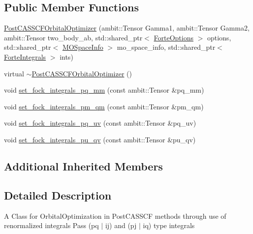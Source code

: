 \subsection*{Public Member Functions}
\begin{DoxyCompactItemize}
\item 
\mbox{\hyperlink{classforte_1_1_post_c_a_s_s_c_f_orbital_optimizer_a3a1a4891ed89f797a48a74d084c0a4f4}{Post\+C\+A\+S\+S\+C\+F\+Orbital\+Optimizer}} (ambit\+::\+Tensor Gamma1, ambit\+::\+Tensor Gamma2, ambit\+::\+Tensor two\+\_\+body\+\_\+ab, std\+::shared\+\_\+ptr$<$ \mbox{\hyperlink{classforte_1_1_forte_options}{Forte\+Options}} $>$ options, std\+::shared\+\_\+ptr$<$ \mbox{\hyperlink{classforte_1_1_m_o_space_info}{M\+O\+Space\+Info}} $>$ mo\+\_\+space\+\_\+info, std\+::shared\+\_\+ptr$<$ \mbox{\hyperlink{classforte_1_1_forte_integrals}{Forte\+Integrals}} $>$ ints)
\item 
virtual \mbox{\hyperlink{classforte_1_1_post_c_a_s_s_c_f_orbital_optimizer_af00d676f08aa31941da688c52cf0bd07}{$\sim$\+Post\+C\+A\+S\+S\+C\+F\+Orbital\+Optimizer}} ()
\item 
void \mbox{\hyperlink{classforte_1_1_post_c_a_s_s_c_f_orbital_optimizer_ac9c648911b5873fc47ffa7b6ead29d47}{set\+\_\+fock\+\_\+integrals\+\_\+pq\+\_\+mm}} (const ambit\+::\+Tensor \&pq\+\_\+mm)
\item 
void \mbox{\hyperlink{classforte_1_1_post_c_a_s_s_c_f_orbital_optimizer_a49d688b303e6d6bebe328b8bb7dc3091}{set\+\_\+fock\+\_\+integrals\+\_\+pm\+\_\+qm}} (const ambit\+::\+Tensor \&pm\+\_\+qm)
\item 
void \mbox{\hyperlink{classforte_1_1_post_c_a_s_s_c_f_orbital_optimizer_a914ddfd4d08e391d1e8ec81970ec0210}{set\+\_\+fock\+\_\+integrals\+\_\+pq\+\_\+uv}} (const ambit\+::\+Tensor \&pq\+\_\+uv)
\item 
void \mbox{\hyperlink{classforte_1_1_post_c_a_s_s_c_f_orbital_optimizer_a02a516e2eb483d69e0eaa7a59fc2358f}{set\+\_\+fock\+\_\+integrals\+\_\+pu\+\_\+qv}} (const ambit\+::\+Tensor \&pu\+\_\+qv)
\end{DoxyCompactItemize}
\subsection*{Additional Inherited Members}


\subsection{Detailed Description}
A Class for Orbital\+Optimization in Post\+C\+A\+S\+S\+CF methods through use of renormalized integrals Pass (pq $\vert$ ij) and (pj $\vert$ iq) type integrals 

